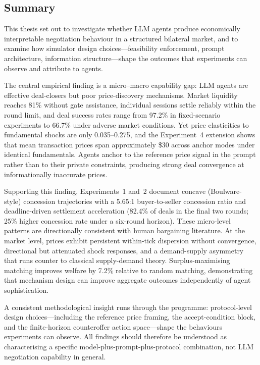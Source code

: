 
\label{sec:conclusion}

\subsection{Summary}

This thesis set out to investigate whether LLM agents produce economically interpretable negotiation behaviour in a structured bilateral market, and to examine how simulator design choices---feasibility enforcement, prompt architecture, information structure---shape the outcomes that experiments can observe and attribute to agents.

The central empirical finding is a micro--macro capability gap: LLM agents are effective deal-closers but poor price-discovery mechanisms.  Market liquidity reaches 81\% without gate assistance, individual sessions settle reliably within the round limit, and deal success rates range from 97.2\% in fixed-scenario experiments to 66.7\% under adverse market conditions.  Yet price elasticities to fundamental shocks are only 0.035--0.275, and the Experiment~4 extension shows that mean transaction prices span approximately \$30 across anchor modes under identical fundamentals.  Agents anchor to the reference price signal in the prompt rather than to their private constraints, producing strong deal convergence at informationally inaccurate prices.

Supporting this finding, Experiments~1 and~2 document concave (Boulware-style) concession trajectories with a 5.65:1 buyer-to-seller concession ratio and deadline-driven settlement acceleration (82.4\% of deals in the final two rounds; 25\% higher concession rate under a six-round horizon).  These micro-level patterns are directionally consistent with human bargaining literature.  At the market level, prices exhibit persistent within-tick dispersion without convergence, directional but attenuated shock responses, and a demand-supply asymmetry that runs counter to classical supply-demand theory.  Surplus-maximising matching improves welfare by 7.2\% relative to random matching, demonstrating that mechanism design can improve aggregate outcomes independently of agent sophistication.

A consistent methodological insight runs through the programme: protocol-level design choices---including the reference price framing, the accept-condition block, and the finite-horizon counteroffer action space---shape the behaviours experiments can observe.  All findings should therefore be understood as characterising a specific model-plus-prompt-plus-protocol combination, not LLM negotiation capability in general.

